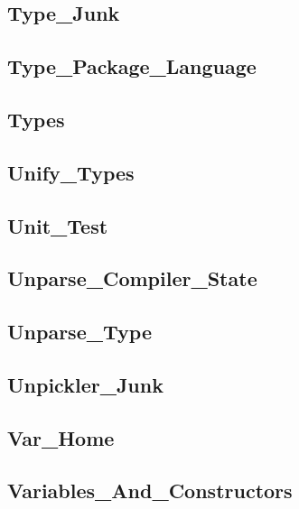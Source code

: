 \subsection{Type\_Junk}					
\subsection{Type\_Package\_Language}			
\subsection{Types}					
\subsection{Unify\_Types}				
\subsection{Unit\_Test}					
\subsection{Unparse\_Compiler\_State}			
\subsection{Unparse\_Type}				
\subsection{Unpickler\_Junk}				
\subsection{Var\_Home}					
\subsection{Variables\_And\_Constructors}		


